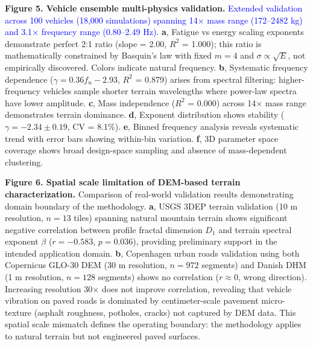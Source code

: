 \documentclass[11pt]{article}
\begin{document}
\textbf{Figure 5. Vehicle ensemble multi-physics validation.} 
\textcolor{blue}{Extended validation across 100 vehicles (18,000 simulations) spanning 14$\times$ mass range (172--2482 kg) and 3.1$\times$ frequency range (0.80--2.49 Hz).} 
\textbf{a}, Fatigue vs energy scaling exponents demonstrate perfect 2:1 ratio (slope = 2.00, $R^2$ = 1.000); this ratio is mathematically constrained by Basquin's law with fixed $m = 4$ and $\sigma \propto \sqrt{E}$, not empirically discovered. Colors indicate natural frequency. 
\textbf{b}, Systematic frequency dependence ($\gamma = 0.36 f_n - 2.93$, $R^2$ = 0.879) arises from spectral filtering: higher-frequency vehicles sample shorter terrain wavelengths where power-law spectra have lower amplitude. 
\textbf{c}, Mass independence ($R^2$ = 0.000) across 14$\times$ mass range demonstrates terrain dominance. 
\textbf{d}, Exponent distribution shows stability ($\gamma = -2.34 \pm 0.19$, CV = 8.1\%). 
\textbf{e}, Binned frequency analysis reveals systematic trend with error bars showing within-bin variation. 
\textbf{f}, 3D parameter space coverage shows broad design-space sampling and absence of mass-dependent clustering.

\textbf{Figure 6. Spatial scale limitation of DEM-based terrain characterization.} 
Comparison of real-world validation results demonstrating domain boundary of the methodology. 
\textbf{a}, USGS 3DEP terrain validation (10 m resolution, $n=13$ tiles) spanning natural mountain terrain shows significant negative correlation between profile fractal dimension $D_1$ and terrain spectral exponent $\beta$ ($r = -0.583$, $p = 0.036$), providing preliminary support in the intended application domain. 
\textbf{b}, Copenhagen urban roads validation using both Copernicus GLO-30 DEM (30 m resolution, $n=972$ segments) and Danish DHM (1 m resolution, $n=128$ segments) shows no correlation ($r \approx 0$, wrong direction). Increasing resolution 30$\times$ does not improve correlation, revealing that vehicle vibration on paved roads is dominated by centimeter-scale pavement micro-texture (asphalt roughness, potholes, cracks) not captured by DEM data. This spatial scale mismatch defines the operating boundary: the methodology applies to natural terrain but not engineered paved surfaces.
\end{document}
